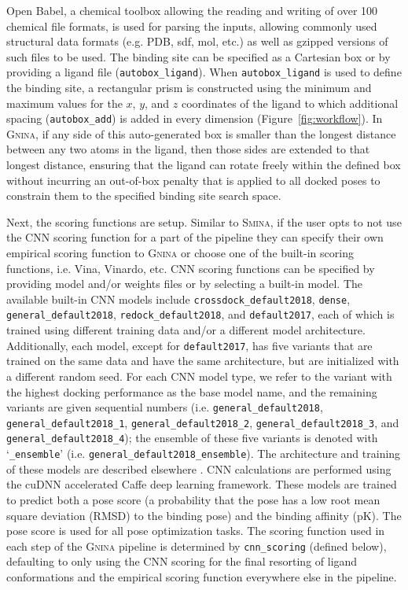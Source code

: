 \documentclass[linenumbers,doublespacing]{bmcart}
\begin{document}
Open Babel\cite{o2011open,babelopen}, a chemical toolbox allowing the reading and writing of over 100 chemical file formats, is used for parsing the inputs, allowing commonly used structural data formats (e.g. PDB, sdf, mol, etc.) as well as gzipped versions of such files to be used. The binding site can be specified as a Cartesian box or by providing a ligand file (\texttt{autobox\_ligand}).  When \texttt{autobox\_ligand} is used to define the binding site, a rectangular prism is constructed using the minimum and maximum values for the $x$, $y$, and $z$ coordinates of the ligand to which additional spacing (\texttt{autobox\_add}) is added in every dimension (Figure~\ref{fig:workflow}). In \textsc{Gnina}, if any side of this auto-generated box is smaller than the longest distance between any two atoms in the ligand, then those sides are extended to that longest distance, ensuring that the ligand can rotate freely within the defined box without incurring an out-of-box penalty that is applied to all docked poses to constrain them to the specified binding site search space.

Next, the scoring functions are setup. Similar to \textsc{Smina}, if the user opts to not use the CNN scoring function for a part of the pipeline they can specify their own empirical scoring function to \textsc{Gnina} or choose one of the built-in scoring functions, i.e. Vina, Vinardo\cite{quiroga2016vinardo}, etc. CNN scoring functions can be specified by providing model and/or weights files or by selecting a built-in model.  The available built-in CNN models include \texttt{crossdock\_default2018}, \texttt{dense}, \texttt{general\_default2018}, \texttt{redock\_default2018}, and \texttt{default2017}, each of which is trained using different training data and/or a different model architecture. Additionally, each model, except for \texttt{default2017}, has five variants that are trained on the same data and have the same architecture, but are initialized with a different random seed. For each CNN model type, we refer to the variant with the highest docking performance as the base model name, and the remaining variants are given sequential numbers (i.e. \texttt{general\_default2018}, \texttt{general\_default2018\_1}, \texttt{general\_default2018\_2}, \texttt{general\_{\allowbreak}default2018\_3}, and \texttt{general\_{\allowbreak}default2018\_4}); the ensemble of these five variants is denoted with `\texttt{\_ensemble}' (i.e. \texttt{general\_{\allowbreak}default2018\_ensemble}). The architecture and training of these models are described elsewhere \cite{francoeur2020three,Ragoza2017}. CNN calculations are performed using the cuDNN accelerated Caffe deep learning framework\cite{jia2014caffe}. These models are trained to predict both a pose score (a probability that the pose has a low root mean square deviation (RMSD) to the binding pose) and the binding affinity (pK). The pose score is used for all pose optimization tasks. The scoring function used in each step of the \textsc{Gnina} pipeline is determined by \texttt{cnn\_scoring} (defined below), defaulting to only using the CNN scoring for the final resorting of ligand conformations and the empirical scoring function everywhere else in the pipeline. 
\end{document}
